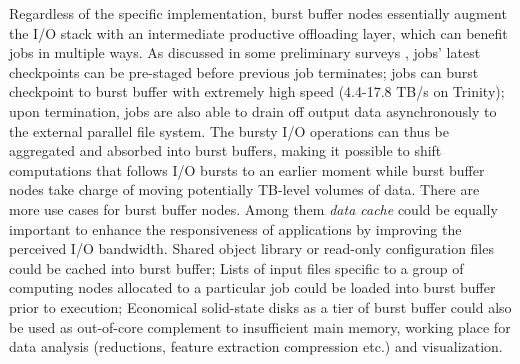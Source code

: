 

Regardless of the specific implementation, burst buffer nodes essentially augment
the I/O stack with an intermediate productive offloading layer, 
which can benefit jobs in multiple ways.
As discussed in some preliminary surveys\cite{BBUseCase, apex-workflow} ,
jobs' latest checkpoints can be pre-staged
before previous job terminates;
jobs can burst checkpoint to burst buffer
with extremely high speed (4.4-17.8 TB/s on Trinity);
upon termination, jobs are also able to drain off output data
asynchronously to the external parallel file system.
The bursty I/O operations can thus be aggregated and absorbed into burst buffers,
making it possible to shift computations that follows I/O bursts to an earlier moment
while burst buffer nodes take charge of moving potentially TB-level volumes of data.
There are more use cases for burst buffer nodes.
Among them \textit{data cache} could be equally important to enhance the responsiveness
of applications by improving the perceived I/O bandwidth\cite{BBUseCase}.
Shared object library or read-only configuration files could be
cached into burst buffer;
Lists of input files specific to a group of computing nodes allocated to
a particular job could be loaded into burst buffer prior to execution;
Economical solid-state disks as a tier of burst buffer could also be used as
out-of-core complement to insufficient main memory\cite{Romanus:CORR:15},
working place for data analysis (reductions, feature extraction compression etc.)
and visualization\cite{BBUseCase}.



